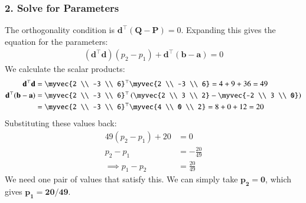 \documentclass[journal]{IEEEtran}
\newcommand{\mat}[1]{\mathbf{#1}}
\begin{document}
\subsubsection*{2. Solve for Parameters}
The orthogonality condition is $\mat{d}^\top(\mat{Q}-\mat{P}) = 0$. Expanding this gives the equation for the parameters:
\begin{align}
(\mat{d}^\top\mat{d})(p_2-p_1) + \mat{d}^\top(\mat{b}-\mat{a}) = 0
\end{align}
We calculate the scalar products:
\begin{align}
\mat{d}^\top\mat{d} &= \myvec{2 \\ -3 \\ 6}^\top \myvec{2 \\ -3 \\ 6} = 4 + 9 + 36 = 49 \\
\mat{d}^\top(\mat{b}-\mat{a}) &= \myvec{2 \\ -3 \\ 6}^\top \left( \myvec{2 \\ 3 \\ 2} - \myvec{-2 \\ 3 \\ 0} \right) \nonumber \\
&= \myvec{2 \\ -3 \\ 6}^\top \myvec{4 \\ 0 \\ 2} = 8 + 0 + 12 = 20
\end{align}
Substituting these values back:
\begin{align}
49(p_2 - p_1) + 20 &= 0 \\
p_2 - p_1 &= -\frac{20}{49} \\
\implies p_1 - p_2 &= \frac{20}{49}
\end{align}
We need one pair of values that satisfy this. We can simply take $\mathbf{p_2 = 0}$, which gives $\mathbf{p_1 = 20/49}$.
\end{document}
